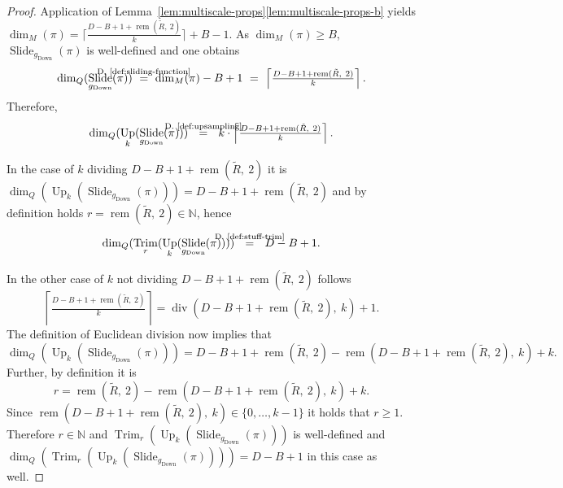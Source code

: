 \documentclass[journal]{IEEEtran}
\newcommand{\N}{\mathbb{N}}
\newcommand{\ROI}{B}
\newcommand{\discint}[2]{\{#1,\dotsc,#2\}}
\newcommand{\inint}[2]{\in\discint{#1}{#2}}
\newcommand{\bceil}[1]{\big\lceil #1 \big\rceil}
\DeclareMathOperator{\Slide}{Slide}
\DeclareMathOperator{\Trimming}{Trim}
\renewcommand{\div}[2]{\operatorname{div}(#1,\ #2)}
\newcommand{\rem}[2]{\operatorname{rem}(#1,\ #2)}
\newcommand{\equsing}[1]{\overset{\mathclap{\text{#1}}}{=}}
\DeclareMathOperator{\Downsampling}{Down}
\DeclareMathOperator{\Upsampling}{Up}
\begin{document}
\begin{theorem}
\end{theorem}\begin{proof}
Application of Lemma~\ref{lem:multiscale-props}\ref{lem:multiscale-props-b} yields $\dim_M(\pi) = \bceil{\frac{D - \ROI + 1 + \rem{\tilde{R}}{2}}{k}} + \ROI - 1$.
As $\dim_M(\pi) \geq \ROI$, $\Slide_{g_{\Downsampling}}(\pi)$ is well-defined and one obtains
\begin{displaymath}
  \dim_Q(\Slide_{g_{\Downsampling}}(\pi))
  \ \equsing{D.~\ref{def:sliding-function}}\ \dim_M(\pi) - \ROI + 1
  \ =\ \left\lceil\tfrac{D - \ROI + 1 + \rem{\tilde{R}}{2}}{k}\right\rceil\text{.}
\end{displaymath}
Therefore,
\begin{displaymath}
  \dim_Q(\Upsampling_k(\Slide_{g_{\Downsampling}}(\pi)))\ \ 
  \equsing{D.~\ref{def:upsampling}}\ \ k\cdot \left\lceil\tfrac{D - \ROI + 1 + \rem{\tilde{R}}{2}}{k}\right\rceil\text{.}
\end{displaymath}

In the case of $k$ dividing $D - \ROI + 1 + \rem{\tilde{R}}{2}$ it is $\dim_Q(\Upsampling_k(\Slide_{g_{\Downsampling}}(\pi))) = D - \ROI + 1 + \rem{\tilde{R}}{2}$ and by definition holds $r = \rem{\tilde{R}}{2}\in\N$, hence
\begin{displaymath}
  \dim_Q(\Trimming_{r}(\Upsampling_k(\Slide_{g_{\Downsampling}}(\pi))))
  \ \ \equsing{D.~\ref{def:stuff-trim}}\ \ D - \ROI + 1\text{.}
\end{displaymath}

In the other case of $k$ not dividing $D - \ROI + 1 + \rem{\tilde{R}}{2}$ follows
\begin{displaymath}
  \left\lceil\tfrac{D - \ROI + 1 + \rem{\tilde{R}}{2}}{k}\right\rceil
  = \div{D - \ROI + 1 + \rem{\tilde{R}}{2}}{k} + 1\text{.}
\end{displaymath}
The definition of Euclidean division now implies that
\begin{displaymath}
     \dim_Q(\Upsampling_k(\Slide_{g_{\Downsampling}}(\pi)))
  =  D - \ROI + 1 + \rem{\tilde{R}}{2} - \rem{D - \ROI + 1 + \rem{\tilde{R}}{2}}{k} + k\text{.}
\end{displaymath}
Further, by definition it is
\begin{displaymath}
  r = \rem{\tilde{R}}{2} - \rem{D - \ROI + 1 + \rem{\tilde{R}}{2}}{k} + k\text{.}
\end{displaymath}
Since $\rem{D - \ROI + 1 + \rem{\tilde{R}}{2}}{k}\inint{0}{k - 1}$ it holds that $r \geq 1$.
Therefore $r\in\N$ and $\Trimming_{r}(\Upsampling_k(\Slide_{g_{\Downsampling}}(\pi)))$ is well-defined and $\dim_Q(\Trimming_{r}(\Upsampling_k(\Slide_{g_{\Downsampling}}(\pi)))) = D - \ROI + 1$ in this case as well.


\end{proof}
\end{document}
